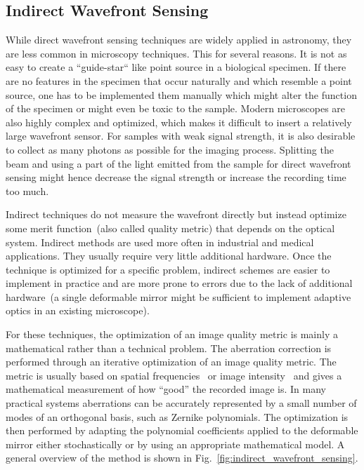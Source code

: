 \subsection{Indirect Wavefront Sensing}
\label{sec:IndirectWavefrontSensing}

While direct wavefront sensing techniques are widely applied in astronomy, they are less common in microscopy techniques. This for several reasons. It is not as easy to create a ``guide-star`` like point source in a biological specimen. If there are no features in the specimen that occur naturally and which resemble a point source, one has to be implemented them manually which might alter the function of the specimen or might even be toxic to the sample. Modern microscopes are also highly complex and optimized, which makes it difficult to insert a relatively large wavefront sensor. For samples with weak signal strength, it is also desirable to collect as many photons as possible for the imaging process. Splitting the beam and using a part of the light emitted from the sample for direct wavefront sensing might hence decrease the signal strength or increase the recording time too much.

Indirect techniques do not measure the wavefront directly but instead optimize some merit function~(also called quality metric) that depends on the optical system. Indirect methods are used more often in industrial and medical applications. They usually require very little additional hardware. Once the technique is optimized for a specific problem, indirect schemes are easier to implement in practice and are more prone to errors due to the lack of additional hardware~(a single deformable mirror might be sufficient to implement adaptive optics in an existing microscope). 

For these techniques, the optimization of an image quality metric is mainly a mathematical rather than a technical problem. The aberration correction is performed through an iterative optimization of an image quality metric. The metric is usually based on spatial frequencies~\cite{wide_AOM_loew_freq} or image intensity~\cite{indirect_metric_intensity} and gives a mathematical measurement of how ``good'' the recorded image is. In many practical systems aberrations can be accurately represented by a small number of modes of an orthogonal basis, such as Zernike polynomials. The optimization is then performed by adapting the polynomial coefficients applied to the deformable mirror either stochastically or by using an appropriate mathematical model. A general overview of the method is shown in Fig.~\ref{fig:indirect_wavefront_sensing}.

